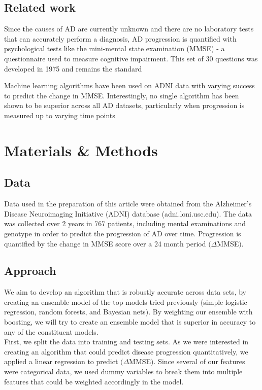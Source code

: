 \documentclass{article}
\begin{document}
\subsection{Related work} Since the causes of AD are currently unknown and there are no laboratory tests that can accurately perform a diagnosis, AD progression is quantified with psychological tests like the mini-mental state examination (MMSE) - a questionnaire used to measure cognitive impairment. This set of 30 questions was developed in 1975 and remains the standard \cite{carolan07}

Machine learning algorithms have been used on ADNI data with varying success to predict the change in MMSE. Interestingly, no single algorithm has been shown to be superior across all AD datasets, particularly when progression is measured up to varying time points \cite{umer11}


\section{Materials \& Methods}
\subsection{Data} Data used in the preparation of this article were obtained from the Alzheimer's Disease Neuroimaging Initiative (ADNI) database (adni.loni.usc.edu). The data was collected over 2 years in 767 patients, including mental examinations and genotype in order to predict the progression of AD over time. Progression is quantified by the change in MMSE score over a 24 month period $(\Delta$MMSE$)$.


\subsection{Approach} We aim to develop an algorithm that is robustly accurate across data sets, by creating an ensemble model of the top models tried previously (simple logistic regression, random forests, and Bayesian nets). By weighting our ensemble with boosting, we will try to create an ensemble model that is superior in accuracy to any of the constituent models.\\

First, we split the data into training and testing sets. As we were interested in creating an algorithm that could predict disease progression quantitatively, we applied a linear regression to predict $(\Delta$MMSE$)$. Since several of our features were categorical data, we used dummy variables to break them into multiple features that could be weighted accordingly in the model.\\
\end{document}
